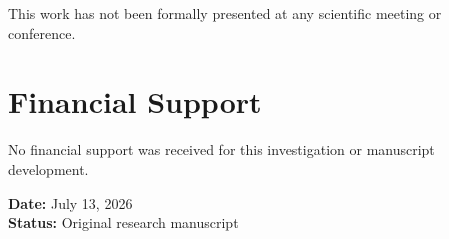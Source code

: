 \documentclass[12pt]{article}
\begin{document}
This work has not been formally presented at any scientific meeting or conference.

\section*{Financial Support}

No financial support was received for this investigation or manuscript development.

\vfill

\begin{center}
\textbf{Date:} July 13, 2026 \\
\textbf{Status:} Original research manuscript
\end{center}
\end{document}
